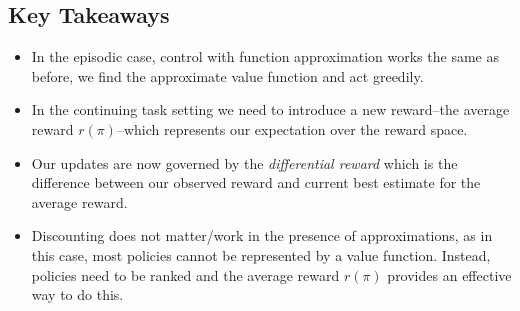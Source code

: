 \subsection{Key Takeaways}
\begin{itemize}
\item In the episodic case, control with function approximation works the same as before, we find the approximate value function and act greedily.
\item In the continuing task setting we need to introduce a new reward–the average reward $r(\pi)$–which represents our expectation over the reward space.
\item Our updates are now governed by the \textit{differential reward} which is the difference between our observed reward and current best estimate for the average reward.
\item Discounting does not matter/work in the presence of approximations, as in this case, most policies cannot be represented by a value function. Instead, policies need to be ranked and the average reward $r(\pi)$ provides an effective way to do this.
\end{itemize}




